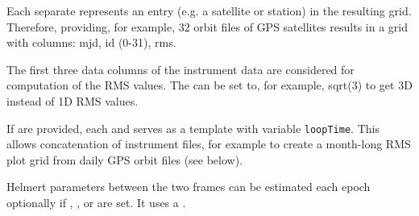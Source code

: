 Each separate  represents an entry (e.g. a satellite or station)
in the resulting grid. Therefore, providing, for example, 32 orbit files of GPS satellites
results in a grid with columns: mjd, id (0-31), rms.

The first three data columns of the instrument data are considered for computation of the RMS values.
The  can be set to, for example, sqrt(3) to get 3D instead of 1D RMS values.

If  are provided, each 
and  serves as a template with variable \verb|loopTime|.
This allows concatenation of instrument files, for example to create a month-long RMS plot grid from daily GPS
orbit files (see below).

Helmert parameters between the two frames can be estimated each epoch optionally if
, , or  are set.
It uses a .



